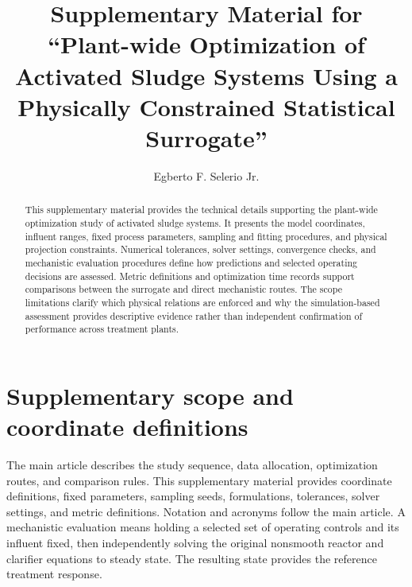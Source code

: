 \documentclass[a4paper,fleqn]{cas-sc}
\begin{document}
\let\WriteBookmarks\relax


\title[mode=title,size=\Large]{Supplementary Material for ``Plant-wide Optimization of Activated Sludge Systems Using a Physically Constrained Statistical Surrogate''}

\author[1]{Egberto F. Selerio Jr.}
\cormark[1]



\begin{abstract}
This supplementary material provides the technical details supporting the plant-wide optimization study of activated sludge systems. It presents the model coordinates, influent ranges, fixed process parameters, sampling and fitting procedures, and physical projection constraints. Numerical tolerances, solver settings, convergence checks, and mechanistic evaluation procedures define how predictions and selected operating decisions are assessed. Metric definitions and optimization time records support comparisons between the surrogate and direct mechanistic routes. The scope limitations clarify which physical relations are enforced and why the simulation-based assessment provides descriptive evidence rather than independent confirmation of performance across treatment plants.
\end{abstract}

\maketitle

\section{Supplementary scope and coordinate definitions}

The main article describes the study sequence, data allocation, optimization routes, and comparison rules. This supplementary material provides coordinate definitions, fixed parameters, sampling seeds, formulations, tolerances, solver settings, and metric definitions. Notation and acronyms follow the main article. A mechanistic evaluation means holding a selected set of operating controls and its influent fixed, then independently solving the original nonsmooth reactor and clarifier equations to steady state. The resulting state provides the reference treatment response.
\end{document}
